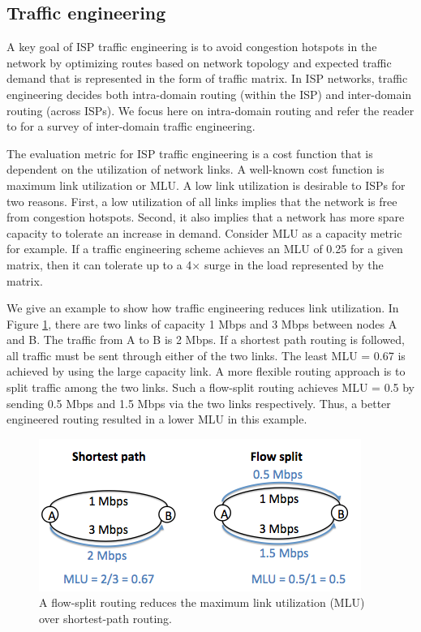 \subsection{Traffic engineering}
\label{sec:ch2-te}

A key goal of ISP traffic engineering is to avoid congestion hotspots in the network by optimizing routes based on network topology and expected traffic demand that is represented in the form of traffic matrix. In ISP networks, traffic engineering decides both intra-domain routing (within the ISP) and inter-domain routing (across ISPs). We focus here on intra-domain routing and refer the reader to  \cite{Feamster2003,rexford} for a survey of inter-domain traffic engineering. 

The evaluation metric for ISP traffic engineering is a cost function that is dependent on the utilization of network links. A well-known cost function is maximum link utilization or MLU. A low link utilization is desirable to ISPs for two reasons. First, a low utilization of all links implies that the network is free from congestion hotspots. Second, it also implies that a network has more spare capacity to tolerate an increase in demand. Consider MLU as a capacity metric for example. If a traffic engineering scheme achieves an MLU of 0.25 for a given matrix, then it can tolerate up to a 4$\times$ surge in the load represented by the matrix.

We give an example to show how traffic engineering reduces link utilization. In Figure \ref{fig:te-example}, there are two links of capacity 1 Mbps and 3 Mbps between nodes A and B. The traffic from A to B is 2 Mbps. If a shortest path routing is followed, all traffic must be sent through either of the two links. The least MLU = 0.67 is achieved by using the large capacity link. A more flexible routing approach is to split traffic among the two links. Such a flow-split routing achieves MLU = 0.5 by sending 0.5 Mbps and 1.5 Mbps via the two links respectively. Thus, a better engineered routing resulted in a lower MLU in this example.

\begin{figure}
	\centering
	\includegraphics[scale=0.6]{fig/te-example.png}
	\caption{A flow-split routing reduces the maximum link utilization (MLU) over shortest-path routing.}
	\label{fig:te-example}
\end{figure}


